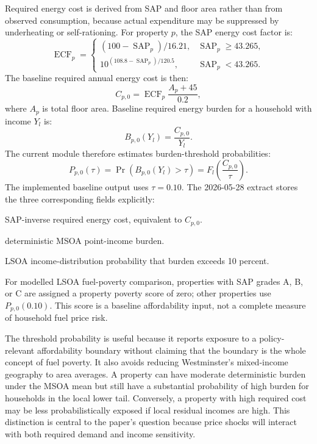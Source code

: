 Required energy cost is derived from SAP and floor area rather than from observed consumption, because actual expenditure may be suppressed by underheating or self-rationing. For property $p$, the SAP energy cost factor is:
\begin{equation}
\operatorname{ECF}_p=
\begin{cases}
(100-\operatorname{SAP}_p)/16.21, & \operatorname{SAP}_p \geq 43.265,\\
10^{(108.8-\operatorname{SAP}_p)/120.5}, & \operatorname{SAP}_p < 43.265.
\end{cases}
\end{equation}
The baseline required annual energy cost is then:
\begin{equation}
C_{p,0}=\operatorname{ECF}_p \frac{A_p+45}{0.2},
\end{equation}
where $A_p$ is total floor area. Baseline required energy burden for a household with income $Y_l$ is:
\begin{equation}
B_{p,0}(Y_l)=\frac{C_{p,0}}{Y_l}.
\end{equation}
The current module therefore estimates burden-threshold probabilities:
\begin{equation}
P_{p,0}(\tau)=\Pr \left(B_{p,0}(Y_l)>\tau \right)
=F_l\left(\frac{C_{p,0}}{\tau}\right).
\end{equation}
The implemented baseline output uses $\tau=0.10$. The 2026-05-28 extract stores the three corresponding fields explicitly:
\begin{description}[leftmargin=0.33\linewidth,style=nextline]
    \item[\texttt{sap\_inverse\_total\_cost}] SAP-inverse required energy cost, equivalent to $C_{p,0}$.
    \item[\texttt{baseline\_required\_energy\_burden}] deterministic MSOA point-income burden.
    \item[\texttt{burden\_prob\_gt\_10}] LSOA income-distribution probability that burden exceeds 10 percent.
\end{description}
For modelled LSOA fuel-poverty comparison, properties with SAP grades A, B, or C are assigned a property poverty score of zero; other properties use $P_{p,0}(0.10)$. This score is a baseline affordability input, not a complete measure of household fuel price risk.

The threshold probability is useful because it reports exposure to a policy-relevant affordability boundary without claiming that the boundary is the whole concept of fuel poverty. It also avoids reducing Westminster's mixed-income geography to area averages. A property can have moderate deterministic burden under the MSOA mean but still have a substantial probability of high burden for households in the local lower tail. Conversely, a property with high required cost may be less probabilistically exposed if local residual incomes are high. This distinction is central to the paper's question because price shocks will interact with both required demand and income sensitivity.


